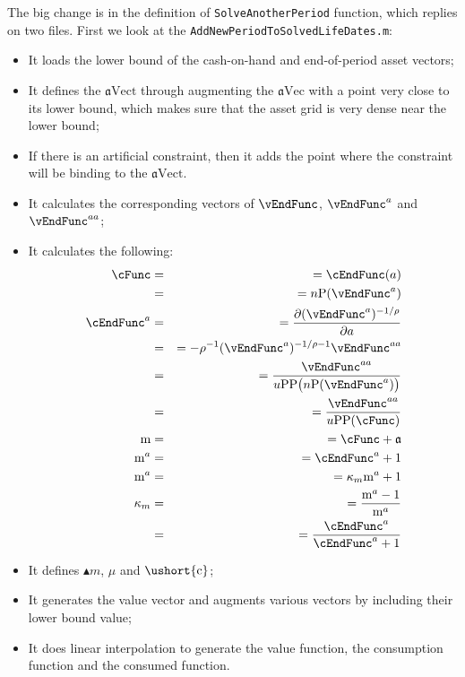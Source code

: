 \documentclass[titlepage,abstract]{\econtex}
\providecommand{\mFunc}{\ensuremath{\mathrm{m}}}
\providecommand{\aEndFunc}{\ensuremath{\mathfrak{a}}}
\begin{document}
The big change is in the definition of \texttt{SolveAnotherPeriod} function, which replies on two files. First we look at the \texttt{AddNewPeriodToSolvedLifeDates.m}:
      \begin{itemize}
        \item It loads the lower bound of the cash-on-hand and end-of-period asset vectors;
        \item It defines the $\ensuremath{\mathfrak{a}}\text{Vect}$ through augmenting the $\ensuremath{\mathfrak{a}}\text{Vec}$ with a point very close to its lower bound, which makes sure that the asset grid is very dense near the lower bound;
        \item If there is an artificial constraint, then it adds the point where the constraint will be binding to the $\ensuremath{\mathfrak{a}}\text{Vect}$.
        \item It calculates the corresponding vectors of $\vEndFunc$, $\vEndFunc^{a}$ and $\vEndFunc^{aa}$;
        \item It calculates the following:
        \begin{equation}\begin{gathered}\begin{aligned}
        \cFunc  &=& =  \cEndFunc(a) \\
         &=& =  n\text{P}(\vEndFunc^{a}) \\
        \cEndFunc^{a}  &=& = \frac{\partial (\vEndFunc^{a})^{-1/\rho}}{\partial a} \\
         &=& =  -\rho^{-1} (\vEndFunc^{a})^{-1/\rho-1} \vEndFunc^{aa} \\
         &=& =  \frac{\vEndFunc^{aa} }{u\text{PP}\big(
        n\text{P}(\vEndFunc^{a})\big)} \\
         &=& =  \frac{\vEndFunc^{aa} }{u\text{PP}(\cFunc)} \\
        \mFunc  &=& =  \cFunc + \aEndFunc \\
        \mFunc^{a}  &=& =  \cEndFunc^{a} + 1 \\
        \mFunc^{a}  &=& =  \kappa_{m}\mFunc^{a} + 1 \\
        \kappa_{m}  &=& =  \frac{\mFunc^{a}-1}{\mFunc^{a}} \\
         &=& =  \frac{\cEndFunc^{a}}{\cEndFunc^{a}+1}
        \end{aligned}\end{gathered}\end{equation}
        \item It defines $\ensuremath{\blacktriangle {m}}$, $\mu$ and $\ensuremath{\ushort{\mathrm{c}}}$;
        \item It generates the value vector and augments various vectors by including their lower bound value;
        \item It does linear interpolation to generate the value function, the consumption function and the consumed function.
        \end{itemize}
\end{document}
